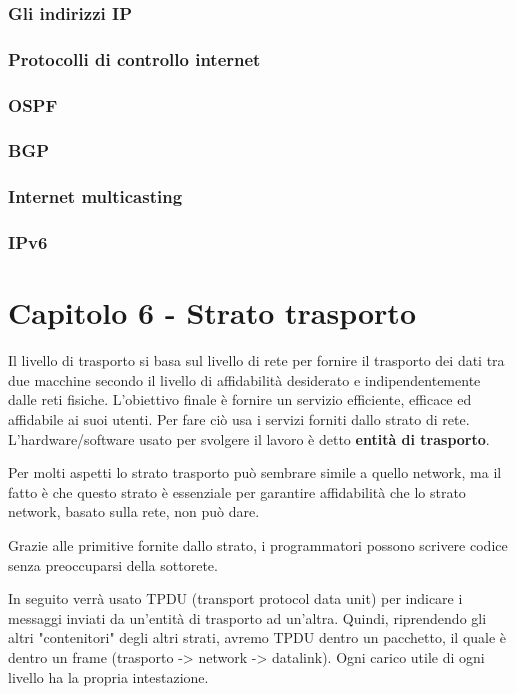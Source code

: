\subsubsection{Gli indirizzi IP}

\subsubsection{Protocolli di controllo internet}


\subsubsection{OSPF}

\subsubsection{BGP}

\subsubsection{Internet multicasting}

\subsubsection{IPv6}

\newpage
\section{Capitolo 6 - Strato trasporto}
Il livello di trasporto si basa sul livello di rete per fornire il trasporto dei dati tra due macchine secondo il livello di affidabilità desiderato e indipendentemente dalle reti fisiche. 
L'obiettivo finale è fornire un servizio efficiente, efficace ed affidabile ai suoi utenti.
Per fare ciò usa i servizi forniti dallo strato di rete. L'hardware/software usato per svolgere il lavoro è detto \textbf{entità di trasporto}.

Per molti aspetti lo strato trasporto può sembrare simile a quello network, ma il fatto è che questo strato è essenziale per garantire affidabilità che lo strato network, basato sulla rete, non può dare. 

Grazie alle primitive fornite dallo strato, i programmatori possono scrivere codice senza preoccuparsi della sottorete.

In seguito verrà usato TPDU (transport protocol data unit) per indicare i messaggi inviati da un'entità di trasporto ad un'altra. 
Quindi, riprendendo gli altri "contenitori" degli altri strati, avremo TPDU dentro un pacchetto, il quale è dentro un frame
(trasporto -> network -> datalink).
Ogni carico utile di ogni livello ha la propria intestazione. 

